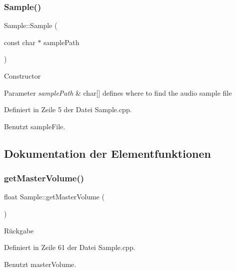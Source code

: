 \subsubsection{\texorpdfstring{Sample()}{Sample()}}
{\footnotesize\ttfamily Sample\+::\+Sample (\begin{DoxyParamCaption}\item[{const char $\ast$}]{sample\+Path }\end{DoxyParamCaption})\hspace{0.3cm}{\ttfamily [explicit]}}

Constructor 
\begin{DoxyParams}{Parameter}
{\em sample\+Path} & char\mbox{[}\mbox{]} defines where to find the audio sample file \\
\hline
\end{DoxyParams}


Definiert in Zeile 5 der Datei Sample.\+cpp.



Benutzt sample\+File.



\subsection{Dokumentation der Elementfunktionen}
\mbox{\label{class_sample_afceddb412ab50a67cb98ca6b72456f24}} 
\subsubsection{\texorpdfstring{get\+Master\+Volume()}{getMasterVolume()}}
{\footnotesize\ttfamily float Sample\+::get\+Master\+Volume (\begin{DoxyParamCaption}{ }\end{DoxyParamCaption})\hspace{0.3cm}{\ttfamily [private]}}

\begin{DoxyReturn}{Rückgabe}

\end{DoxyReturn}


Definiert in Zeile 61 der Datei Sample.\+cpp.



Benutzt master\+Volume.

\mbox{\label{class_sample_a5728b28ce6f6ee19a1b84eddded4fa97}} 

